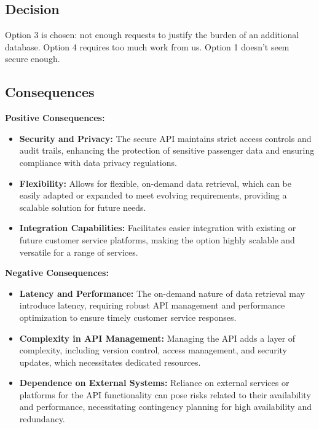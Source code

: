 \subsection*{Decision}
Option 3 is chosen: not enough requests to justify the burden of an additional database. Option 4 requires too much work from us. Option 1 doesn't seem secure enough.

\subsection*{Consequences}
\textbf{Positive Consequences:}
\begin{itemize}[noitemsep]
    \item \textbf{Security and Privacy:} The secure API maintains strict access controls and audit trails, enhancing the protection of sensitive passenger data and ensuring compliance with data privacy regulations.
    \item \textbf{Flexibility:} Allows for flexible, on-demand data retrieval, which can be easily adapted or expanded to meet evolving requirements, providing a scalable solution for future needs.
    \item \textbf{Integration Capabilities:} Facilitates easier integration with existing or future customer service platforms, making the option highly scalable and versatile for a range of services.
\end{itemize}

\textbf{Negative Consequences:}
\begin{itemize}[noitemsep]
    \item \textbf{Latency and Performance:} The on-demand nature of data retrieval may introduce latency, requiring robust API management and performance optimization to ensure timely customer service responses.
    \item \textbf{Complexity in API Management:} Managing the API adds a layer of complexity, including version control, access management, and security updates, which necessitates dedicated resources.
    \item \textbf{Dependence on External Systems:} Reliance on external services or platforms for the API functionality can pose risks related to their availability and performance, necessitating contingency planning for high availability and redundancy.
\end{itemize}